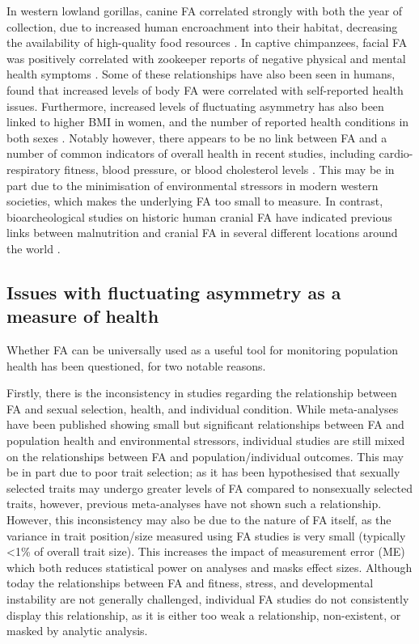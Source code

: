 In western lowland gorillas, canine FA correlated strongly with both the year of collection, due to increased human encroachment into their habitat, decreasing the availability of high-quality food resources \citep{Manning.1994}. In captive chimpanzees, facial FA was positively correlated with zookeeper reports of negative physical and mental health symptoms \citep{Sefcek.2007akp}.
Some of these relationships have also been seen in humans, \citet{Thornhill.2006} found that increased levels of body FA were correlated with self-reported health issues. Furthermore, increased levels of fluctuating asymmetry has also been linked to higher BMI in women, and the number of reported health conditions in both sexes \citep{Milne.2003, Al-Eisa.2004}. Notably however, there appears to be no link between FA and a number of common indicators of overall health in recent studies, including cardio-respiratory fitness, blood pressure, or blood cholesterol levels \citep{Milne.2003, Thornhill.2006, Dongen.2011}. This may be in part due to the minimisation of environmental stressors in modern western societies, which makes the underlying FA too small to measure. In contrast, bioarcheological studies on historic human cranial FA have indicated previous links between malnutrition and cranial FA in several different locations around the world \citep{DeLeon.2007,Dongen.2011,Jung.2016}.

\subsection{Issues with fluctuating asymmetry as a measure of health}
Whether FA can be universally used as a useful tool for monitoring population health has been questioned, for two notable reasons. 

Firstly, there is the inconsistency in studies regarding the relationship between FA and sexual selection, health, and individual condition. While meta-analyses have been published showing small but significant relationships between FA and population health and environmental stressors, individual studies are still mixed on the relationships between FA and population/individual outcomes.  This may be in part due to poor trait selection; as it has been hypothesised that sexually selected traits may undergo greater levels of FA compared to nonsexually selected traits, however, previous meta-analyses have not shown such a relationship. However, this inconsistency may also be due to the nature of FA itself, as the variance in trait position/size measured using FA studies is very small (typically <1\% of overall trait size). This increases the impact of measurement error (ME) which both reduces statistical power on analyses and masks effect sizes. Although today the relationships between FA and fitness, stress, and developmental instability are not generally challenged, individual FA studies do not consistently display this relationship, as it is either too weak a relationship, non-existent, or masked by analytic analysis.

